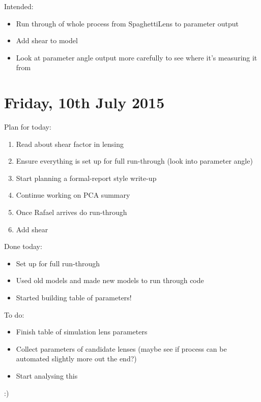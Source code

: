 \documentclass{article}
\begin{document}
\noindent Intended:
\begin{itemize}
  \item Run through of whole process from SpaghettiLens to parameter output
  \item Add shear to model
  \item Look at parameter angle output more carefully to see where it's measuring it from
\end{itemize}\newpage

\section{Friday, 10th July 2015}
\noindent Plan for today:
\begin{enumerate}
  \item Read about shear factor in lensing
  \item Ensure everything is set up for full run-through (look into parameter angle)
  \item Start planning a formal-report style write-up
  \item Continue working on PCA summary
  \item Once Rafael arrives do run-through
  \item Add shear
\end{enumerate}

\noindent Done today:
\begin{itemize}
  \item Set up for full run-through
  \item Used old models and made new models to run through code
  \item Started building table of parameters!
\end{itemize}

\noindent To do:
\begin{itemize}
  \item Finish table of simulation lens parameters
  \item Collect parameters of candidate lenses (maybe see if process can be automated slightly more out the end?)
  \item Start analysing this
\end{itemize}

:)
\end{document}

